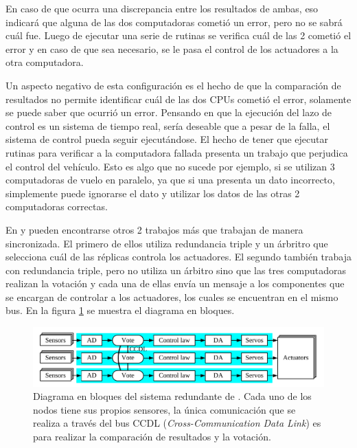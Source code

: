 En caso de que ocurra una discrepancia entre los resultados de ambas, eso indicará que alguna de las dos computadoras cometió un error, pero no se sabrá cuál fue. Luego de ejecutar una serie de rutinas se verifica cuál de las 2 cometió el error y en caso de que sea necesario, se le pasa el control de los actuadores a la otra computadora.

Un aspecto negativo de esta configuración es el hecho de que la comparación de resultados no permite identificar cuál de las dos CPUs cometió el error, solamente se puede saber que ocurrió un error. Pensando en que la ejecución del lazo de control es un sistema de tiempo real, sería deseable que a pesar de la falla, el sistema de control pueda seguir ejecutándose. El hecho de tener que ejecutar rutinas para verificar a la computadora fallada presenta un trabajo que perjudica el control del vehículo. Esto es algo que no sucede por ejemplo, si se utilizan 3 computadoras de vuelo en paralelo, ya que si una presenta un dato incorrecto, simplemente puede ignorarse el dato y utilizar los datos de las otras 2 computadoras correctas. %

En \cite{chen2015design} y \cite{wang2008development} pueden encontrarse otros 2 trabajos más que trabajan de manera sincronizada. El primero de ellos utiliza redundancia triple y un árbritro que selecciona cuál de las réplicas controla los actuadores. El segundo también trabaja con redundancia triple, pero no utiliza un árbitro sino que las tres computadoras realizan la votación y cada una de ellas envía un mensaje a los componentes que se encargan de controlar a los actuadores, los cuales se encuentran en el mismo bus. En la figura \ref{fig:RS_485_sync} se muestra el diagrama en bloques.

\begin{figure}[H]
    \centering
    \includegraphics[width=\textwidth]{img/RS_485_sync.png}
    \caption{Diagrama en bloques del sistema redundante de \cite{wang2008development}. Cada uno de los nodos tiene sus propios sensores, la única comunicación que se realiza a través del bus CCDL (\textit{Cross-Communication Data Link}) es para realizar la comparación de resultados y la votación.}
    \label{fig:RS_485_sync}
\end{figure}

